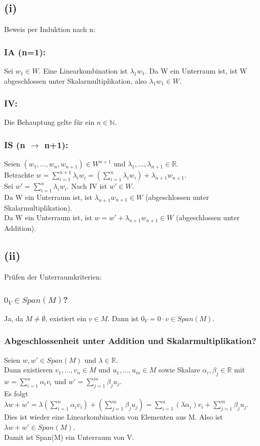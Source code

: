 \documentclass{article}
\begin{document}
\subsection*{(i)}
Beweis per Induktion nach n: 
\subsubsection*{IA (n=1):} Sei $w_1 \in W$. Eine Linearkombination ist $\lambda_1 w_1$. Da W ein Unterraum ist, ist W abgeschlossen unter Skalarmultiplikation, also $\lambda_1 w_1 \in W$. 
\subsubsection*{IV:} Die Behauptung gelte für ein $n \in \mathbb{N}$. 
\subsubsection*{IS (n $\to$ n+1):} Seien $(w_1, ..., w_n, w_{n+1}) \in W^{n+1}$ und $\lambda_1, ..., \lambda_{n+1} \in \mathbb{R}$. \\ Betrachte $w = \sum_{i=1}^{n+1} \lambda_i w_i = (\sum_{i=1}^n \lambda_i w_i) + \lambda_{n+1} w_{n+1}$. \\
Sei $w' = \sum_{i=1}^n \lambda_i w_i$. Nach IV ist $w' \in W$. \\
Da W ein Unterraum ist, ist $\lambda_{n+1} w_{n+1} \in W$ (abgeschlossen unter Skalarmultiplikation). \\
Da W ein Unterraum ist, ist $w = w' + \lambda_{n+1} w_{n+1} \in W$ (abgeschlossen unter Addition).
    

\subsection*{(ii)}
Prüfen der Unterraumkriterien:
\subsubsection*{$0_V \in Span(M)$?}
Ja, da $M \ne \emptyset$, existiert ein $v \in M$. Dann ist $0_V = 0 \cdot v \in Span(M)$.
\subsubsection*{Abgeschlossenheit unter Addition und Skalarmultiplikation?}
Seien $w, w' \in Span(M)$ und $\lambda \in \mathbb{R}$.\\ 
Dann existieren $v_1, ..., v_n \in M$ und $u_1, ..., u_m \in M$ sowie Skalare $\alpha_i, \beta_j \in \mathbb{R}$ mit $w = \sum_{i=1}^n \alpha_i v_i$ und $w' = \sum_{j=1}^m \beta_j u_j$.\\
Es folgt $\lambda w + w' = \lambda (\sum_{i=1}^n \alpha_i v_i) + (\sum_{j=1}^m \beta_j u_j) = \sum_{i=1}^n (\lambda \alpha_i) v_i + \sum_{j=1}^m \beta_j u_j$. \\
Dies ist wieder eine Linearkombination von Elementen aus M. Also ist $\lambda w + w' \in Span(M)$. \\
Damit ist Span(M) ein Unterraum von V. 
\end{document}
